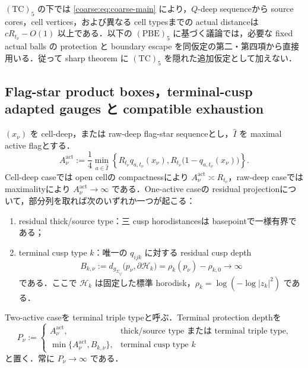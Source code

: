 \documentclass[a4paper,11pt]{ltjsarticle}
\numberwithin{equation}{section}
\theoremstyle{plain}
\theoremstyle{definition}
\theoremstyle{remark}
\begin{document}
$\mathrm{(TC)}_5$ の下では \eqref{coarse:eq:coarse-main} により，$Q$-deep sequenceから source cores，cell vertices，および異なる cell typesまでの actual distanceは
$cR_{t_\nu}-O(1)$ 以上である．以下の $\mathrm{(PBE)}_5$ に基づく議論では，必要な fixed actual balls の protection と boundary escape を同仮定の第二・第四項から直接用いる．従って sharp theorem に $\mathrm{(TC)}_5$ を隠れた追加仮定として加えない．

\subsection{Flag-star product boxes，terminal-cusp adapted gauges と compatible exhaustion}

\begin{definition}\label{sharp:def:active-protection-depth}
$(x_\nu)$ を cell-deep，または raw-deep flag-star sequenceとし，$\widehat I$ を maximal active flagとする．
\begin{equation}\label{sharp:eq:active-protection-depth}
 A_\nu^{\mathrm{act}}
 :=\frac14\min_{a\in\widehat I}
 \left\{R_{t_\nu}q_{a,t_\nu}(x_\nu),
 R_{t_\nu}\bigl(1-q_{a,t_\nu}(x_\nu)\bigr)\right\}.
\end{equation}
Cell-deep caseでは open cellの compactnessにより $A_\nu^{\mathrm{act}}\asymp R_{t_\nu}$，raw-deep caseでは maximalityにより $A_\nu^{\mathrm{act}}\to\infty$ である．One-active caseの residual projectionについて，部分列を取れば次のいずれか一つが起こる：
\begin{enumerate}[label=\textup{(T\arabic*)}]
\item residual thick/source type：三 cusp horodistancesは basepointで一様有界である；
\item terminal cusp type $k$：唯一の $q_{ijk}$ に対する residual cusp depth
      \[
       B_{k,\nu}:=d_{g_{\Sigma_{ij}}}\bigl(p_\nu,\partial\mathcal H_k\bigr)
       =\rho_k(p_\nu)-\rho_{k,0}\longrightarrow\infty
      \]
      である．ここで $\mathcal H_k$ は固定した標準 horodisk，$\rho_k=\log(-\log|z_k|^2)$ である．
\end{enumerate}
Two-active caseを terminal triple typeと呼ぶ．Terminal protection depthを
\begin{equation}\label{sharp:eq:terminal-protection-depth}
 P_\nu:=
 \begin{cases}
 A_\nu^{\mathrm{act}},&\text{thick/source type または terminal triple type},\\
 \min\{A_\nu^{\mathrm{act}},B_{k,\nu}\},&\text{terminal cusp type }k
 \end{cases}
\end{equation}
と置く．常に $P_\nu\to\infty$ である．
\end{definition}
\end{document}
